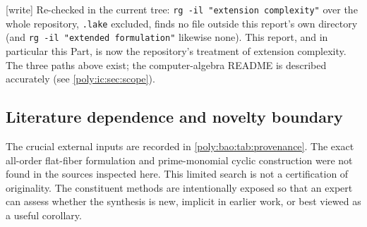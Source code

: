 \documentclass[11pt,a4paper]{article}
\numberwithin{equation}{section}
\theoremstyle{plain}
\newcommand{\wtag}{\textup{[write]}}%
\begin{document}
\wtag{} Re-checked in the current tree: \texttt{rg -il "extension
complexity"} over the whole repository, \texttt{.lake} excluded, finds
no file outside this report's own directory (and \texttt{rg -il "extended
formulation"} likewise none). This report, and in particular this Part,
is now the repository's treatment of extension complexity. The three
paths above exist; the computer-algebra README is described accurately
(see \cref{poly:ic:sec:scope}).

\subsection{Literature dependence and novelty boundary}
The crucial external inputs are recorded in \cref{poly:bao:tab:provenance}.
The exact all-order flat-fiber formulation and prime-monomial cyclic
construction were not found in the sources inspected here. This limited
search is not a certification of originality. The constituent methods
are intentionally exposed so that an expert can assess whether the
synthesis is new, implicit in earlier work, or best viewed as a useful
corollary.
\end{document}
